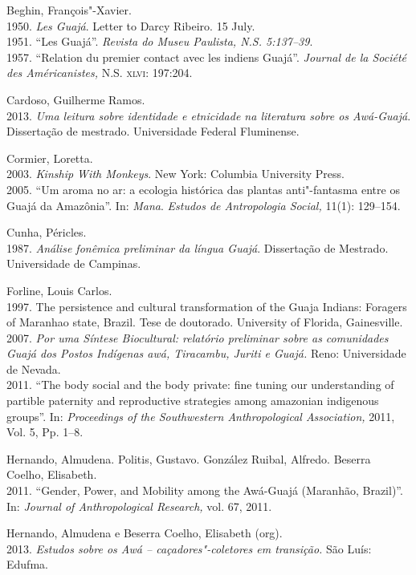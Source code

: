 \begin{bibliohedra}
Beghin, François"-Xavier.\\
1950. \emph{Les Guajá}. Letter to Darcy
Ribeiro. 15 July.\\
1951. ``Les Guajá''. \emph{Revista do Museu
Paulista, N.S. 5:137--39}.\\
1957. ``Relation du premier contact avec les indiens
Guajá''. \emph{Journal de la Société des Américanistes,} N.S. \textsc{xlvi}:
197:204.

Cardoso, Guilherme Ramos.\\
2013. \emph{Uma leitura sobre identidade e
etnicidade na literatura sobre os Awá-Guajá}. Dissertação de mestrado.
Universidade Federal Fluminense.

Cormier, Loretta.\\
2003. \emph{Kinship With Monkeys}. New York: Columbia
University Press.\\
2005. ``Um aroma no ar: a ecologia histórica das
plantas anti"-fantasma entre os Guajá da Amazônia''. In: \emph{Mana}.
\emph{Estudos de Antropologia Social,} 11(1): 129--154.

Cunha, Péricles.\\
1987. \emph{Análise fonêmica preliminar da língua
Guajá}. Dissertação de Mestrado. Universidade de Campinas.

Forline, Louis Carlos.\\
1997. The persistence and cultural transformation
of the Guaja Indians: Foragers of Maranhao state, Brazil. Tese de
doutorado. University of Florida, Gainesville.\\
2007. \emph{Por uma Síntese Biocultural:
relatório preliminar sobre as comunidades Guajá dos Postos Indígenas
awá, Tiracambu, Juriti e Guajá.} Reno: Universidade de Nevada.\\
2011. ``The body social and the body private: fine
tuning our understanding of partible paternity and reproductive
strategies among amazonian indigenous groups''. In: \emph{Proceedings of
the Southwestern Anthropological Association,} 2011, Vol. 5, Pp. 1--8.

Hernando, Almudena. Politis, Gustavo. González Ruibal, Alfredo.
Beserra Coelho, Elisabeth.\\
2011. ``Gender, Power, and Mobility among the Awá-Guajá
(Maranhão, Brazil)''. In: \emph{Journal of Anthropological Research,}
vol. 67, 2011.

Hernando, Almudena e Beserra Coelho, Elisabeth (org).\\
2013. \emph{Estudos sobre os Awá -- caçadores"-coletores em transição.} São
Luís: Edufma.


\end{bibliohedra}
